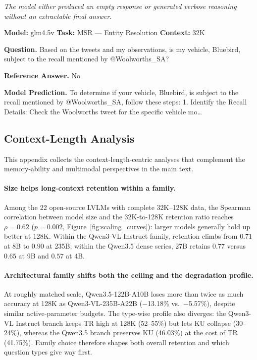 \documentclass{llmxive}
\begin{document}
\begin{tcolorbox}[
  title={Case Study: Non-Answer Pathology},
  enhanced, sharp corners,
  colback=gray!3, colframe=black!40,
  boxrule=0.4pt, fonttitle=\bfseries,
  left=4pt, right=4pt, top=3pt, bottom=3pt
]
\footnotesize

\textit{The model either produced an empty response or generated verbose reasoning without an extractable final answer.}
\vspace{0.4em}

\textbf{Model:} glm4.5v \hfill \textbf{Task:} MSR --- Entity Resolution \hfill \textbf{Context:} 32K
\vspace{0.3em}

\textbf{Question.} Based on the tweets and my observations, is my vehicle, Bluebird, subject to the recall mentioned by @Woolworths\_SA?
\vspace{0.3em}

\textbf{Reference Answer.} No

\textbf{Model Prediction.} To determine if your vehicle, Bluebird, is subject to the recall mentioned by @Woolworths\_SA, follow these steps: 1. Identify the Recall Details: Check the Woolworths tweet for the specific vehicle mo\ldots

\end{tcolorbox}


\subsection{Context-Length Analysis}
\label{app:extended_analysis}

This appendix collects the context-length-centric analyses that complement the memory-ability and multimodal perspectives in the main text.

\paragraph{Size helps long-context retention within a family.}
Among the 22 open-source LVLMs with complete 32K--128K data, the Spearman correlation between model size and the 32K-to-128K retention ratio reaches $\rho = 0.62$ ($p = 0.002$, Figure~\ref{fig:scaling_curves}): larger models generally hold up better at 128K. Within the Qwen3-VL Instruct family, retention climbs from $0.71$ at 8B to $0.90$ at 235B; within the Qwen3.5 dense series, 27B retains $0.77$ versus $0.65$ at 9B and $0.57$ at 4B.

\paragraph{Architectural family shifts both the ceiling and the degradation profile.}
At roughly matched scale, Qwen3.5-122B-A10B loses more than twice as much accuracy at 128K as Qwen3-VL-235B-A22B ($-$13.18\% vs.\ $-$5.57\%), despite similar active-parameter budgets. The type-wise profile also diverges: the Qwen3-VL Instruct branch keeps TR high at 128K (52--55\%) but lets KU collapse (30--24\%), whereas the Qwen3.5 branch preserves KU (46.03\%) at the cost of TR (41.75\%). Family choice therefore shapes both overall retention and which question types give way first.
\end{document}
